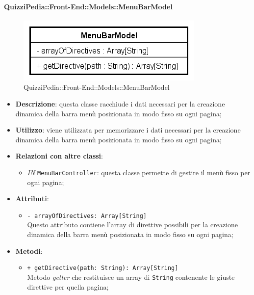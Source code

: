 \paragraph{QuizziPedia::Front-End::Models::MenuBarModel}
		
		\label{QuizziPedia::Front-End::Models::MenuBarModel}
		
		\begin{figure}[ht]
			\centering
			\includegraphics[scale=0.5,keepaspectratio]{UML/Classi/Front-End/QuizziPedia_Front-end_Models_MenuBarModel.png}
			\caption{QuizziPedia::Front-End::Models::MenuBarModel}
		\end{figure} \FloatBarrier
		
		\begin{itemize}
			\item \textbf{Descrizione}: questa classe racchiude i dati necessari per la creazione dinamica della barra menù posizionata in modo fisso su ogni pagina;
			\item \textbf{Utilizzo}: viene utilizzata per memorizzare i dati necessari per la creazione dinamica della barra menù posizionata in modo fisso su ogni pagina;
			\item \textbf{Relazioni con altre classi}: 
			\begin{itemize}
				\item \textit{IN} \texttt{MenuBarController}: questa classe permette di gestire il menù fisso per ogni pagina;
			\end{itemize}
			\item \textbf{Attributi}: 
			\begin{itemize}
				\item \texttt{- arrayOfDirectives: Array[String]}\\
				Questo attributo contiene l'array di direttive possibili per la creazione dinamica della barra menù posizionata in modo fisso su ogni pagina;
			\end{itemize}
			\item \textbf{Metodi}: 
			\begin{itemize}
				\item \texttt{+ getDirective(path: String): Array[String]} \\
				Metodo \textit{getter} che restituisce un array di \texttt{String} contenente le giuste direttive per quella pagina;
			\end{itemize}
		\end{itemize}		
		
		
		